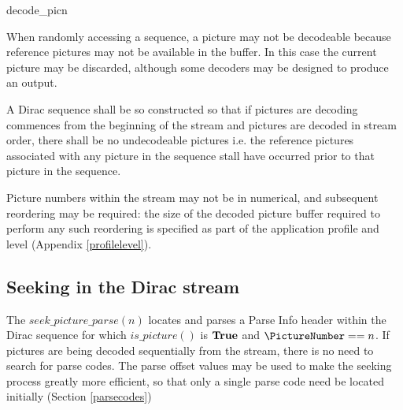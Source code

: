 \begin{pseudo}{decode\_pic}{n}
\bsIF{\ZeroResidual==\false}
\bsEND
{}
    \bsEND
\bsEND
{}
\bsEND
\end{pseudo}

When randomly accessing a sequence, a picture may not be decodeable because reference pictures
may not be available in the buffer. In this case the current picture may be discarded, although some
decoders may be designed to produce an output. 

A Dirac sequence shall be so constructed so that if
pictures are decoding commences from the beginning of the stream and pictures are decoded in 
stream order, there shall be no undecodeable pictures i.e. the reference pictures associated with
any picture in the sequence stall have occurred prior to that picture in the sequence.

Picture numbers within the stream may not be in numerical, and subsequent reordering may be
required: the size of the decoded picture buffer required to perform any such reordering is specified
as part of the application profile and level (Appendix \ref{profilelevel}).

\subsection{Seeking in the Dirac stream}
\label{seeking}

The $seek\_picture\_parse(n)$ locates and parses a Parse Info header within the Dirac sequence for
which $is\_picture()$ is $\text{\bf{True}}$ and $\PictureNumber==n$. If pictures are being decoded sequentially
from the stream, there is no need to search for parse codes. The parse offset values may be used
to make the seeking process greatly more efficient, so that only a single parse code need be located
initially (Section \ref{parsecodes})

